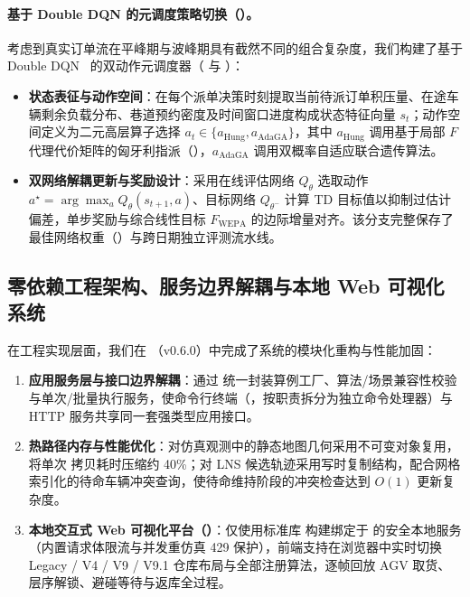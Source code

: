 \paragraph{基于 Double DQN 的元调度策略切换（）。} 考虑到真实订单流在平峰期与波峰期具有截然不同的组合复杂度，我们构建了基于 Double DQN~\cite{vanhasselt2016ddqn} 的双动作元调度器（ 与 ）：
\begin{itemize}
  \item \textbf{状态表征与动作空间}：在每个派单决策时刻提取当前待派订单积压量、在途车辆剩余负载分布、巷道预约密度及时间窗口进度构成状态特征向量 $s_t$；动作空间定义为二元高层算子选择 $a_t \in \{a_{\text{Hung}}, a_{\text{AdaGA}}\}$，其中 $a_{\text{Hung}}$ 调用基于局部 $F$ 代理代价矩阵的匈牙利指派（），$a_{\text{AdaGA}}$ 调用双概率自适应联合遗传算法。
  \item \textbf{双网络解耦更新与奖励设计}：采用在线评估网络 $Q_\theta$ 选取动作 $a^\star = \arg\max_a Q_\theta(s_{t+1}, a)$、目标网络 $Q_{\theta^-}$ 计算 TD 目标值以抑制过估计偏差，单步奖励与综合线性目标 $F_{\text{WEPA}}$ 的边际增量对齐。该分支完整保存了最佳网络权重（）与跨日期独立评测流水线。
\end{itemize}

\subsection{零依赖工程架构、服务边界解耦与本地 Web 可视化系统}

在工程实现层面，我们在 （v0.6.0）中完成了系统的模块化重构与性能加固：
\begin{enumerate}
  \item \textbf{应用服务层与接口边界解耦}：通过  统一封装算例工厂、算法/场景兼容性校验与单次/批量执行服务，使命令行终端（，按职责拆分为独立命令处理器）与 HTTP 服务共享同一套强类型应用接口。
  \item \textbf{热路径内存与性能优化}：对仿真观测中的静态地图几何采用不可变对象复用，将单次  拷贝耗时压缩约 40\%；对 LNS 候选轨迹采用写时复制结构，配合网格索引化的待命车辆冲突查询，使待命维持阶段的冲突检查达到 $O(1)$ 更新复杂度。
  \item \textbf{本地交互式 Web 可视化平台（）}：仅使用标准库  构建绑定于  的安全本地服务（内置请求体限流与并发重仿真 429 保护），前端支持在浏览器中实时切换 Legacy / V4 / V9 / V9.1 仓库布局与全部注册算法，逐帧回放 AGV 取货、层序解锁、避碰等待与返库全过程。
\end{enumerate}
